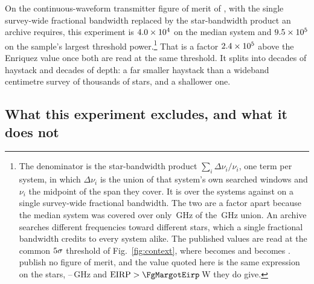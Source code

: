 On the continuous-waveform transmitter figure of merit of
\citet{Enriquez2017}, with the single survey-wide fractional bandwidth
replaced by the star-bandwidth product an archive requires, this experiment
is $4.0\times10^{4}$ on the median system and $9.5\times10^{5}$ on the sample's
largest threshold power.\footnote{The denominator is the star-bandwidth
product $\sum_{i}\Delta\nu_{i}/\nu_{i}$, one term per system, in which
$\Delta\nu_{i}$ is the union of that system's own searched windows and
$\nu_{i}$ the midpoint of the span they cover. It is \CwSigma{} over the
\CwNSys{} systems against \CwUniform{} on a single survey-wide fractional
bandwidth. The two are a factor \CwRatio{} apart because the median system was covered
over only \SysUnionAMed\,GHz of the \CvUnionA\,GHz union. An archive
searches different frequencies toward different stars, which a single
fractional bandwidth credits to every system alike. The published values are
read at the common $5\sigma$ threshold of Fig.~\ref{fig:context}, where
\FomLitEnriquez{} becomes \FomLitEnriquezFive{} and \FgLitMargot{} becomes
\FgLitMargotFive. \citet{Margot2023} publish no figure of merit, and the
value quoted here is the same expression on the \FomMargotN{} stars,
\FomMargotLo--\FomMargotHi\,GHz and $\mathrm{EIRP}>\FgMargotEirp$\,W
they do give.} That is a factor $2.4\times10^{5}$ above the
Enriquez value once both are read at the same threshold. It splits into
\CwBandDex{} decades of haystack and \CwEirpDex{} decades of depth: a far
smaller haystack than a wideband centimetre survey of thousands of stars,
and a shallower one.

\subsection{What this experiment excludes, and what it does not}
\label{sec:excludes}

